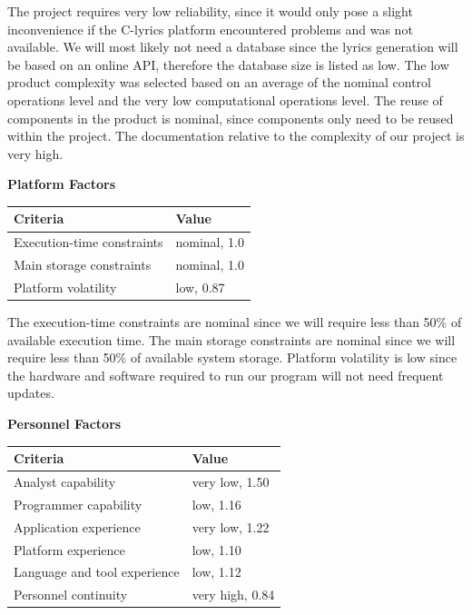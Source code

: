 \documentclass[]{article}
\begin{document}
The project requires very low reliability, since it would only pose a
slight inconvenience if the C-lyrics platform encountered problems and
was not available. We will most likely not need a database since the
lyrics generation will be based on an online API, therefore the database
size is listed as low. The low product complexity was selected based on
an average of the nominal control operations level and the very low
computational operations level. The reuse of components in the product
is nominal, since components only need to be reused within the project.
The documentation relative to the complexity of our project is very
high.


\begin{center}
\textbf{Platform Factors} \\
{
\centering
\begin{tabular}{ p{4cm} | p{4cm} }
Criteria & Value \\
\hline
Execution-time constraints & nominal, 1.0 \\
Main storage constraints & nominal, 1.0\\
Platform volatility & low, 0.87\\
\end{tabular}
}
\end{center}

The execution-time constraints are nominal since we will require less
than 50\% of available execution time. The main storage constraints are
nominal since we will require less than 50\% of available system
storage. Platform volatility is low since the hardware and software
required to run our program will not need frequent updates.

\begin{center}
\textbf{Personnel Factors} \\
{
\centering
\begin{tabular}{ p{4cm} | p{4cm} }
Criteria & Value \\
\hline
Analyst capability & very low, 1.50 \\
Programmer capability & low, 1.16 \\
Application experience & very low, 1.22 \\
Platform experience & low, 1.10 \\
Language and tool experience & low, 1.12 \\
Personnel continuity & very high, 0.84 \\
\end{tabular}
}
\end{center}
\end{document}
